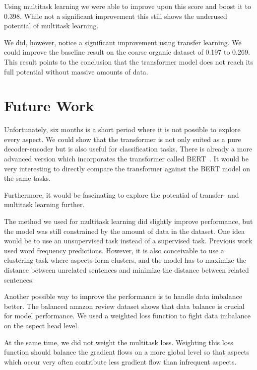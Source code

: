 Using multitask learning we were able to improve upon this score and boost it to 0.398. While not a significant improvement this still shows the underused potential of multitask learning.
\medskip

We did, however, notice a significant improvement using transfer learning. We could improve the baseline result on the coarse organic dataset of 0.197 to 0.269. This result points to the conclusion that the transformer model does not reach its full potential without massive amounts of data.

\section{Future Work}

Unfortunately, six months is a short period where it is not possible to explore every aspect. We could show that the transformer is not only suited as a pure decoder-encoder but is also useful for classification tasks. There is already a more advanced version which incorporates the transformer called BERT~\cite{Devlin2018}. It would be very interesting to directly compare the transformer against the BERT model on the same tasks.
\medskip

Furthermore, it would be fascinating to explore the potential of transfer- and multitask learning further.
\smallskip

The method we used for multitask learning did slightly improve performance, but the model was still constrained by the amount of data in the dataset. One idea would be to use an unsupervised task instead of a supervised task. Previous work used word frequency predictions. However, it is also conceivable to use a clustering task where aspects form clusters, and the model has to maximize the distance between unrelated sentences and minimize the distance between related sentences.
\medskip

Another possible way to improve the performance is to handle data imbalance better. The balanced amazon review dataset shows that data balance is crucial for model performance. We used a weighted loss function to fight data imbalance on the aspect head level.
\smallskip

At the same time, we did not weight the multitask loss. Weighting this loss function should balance the gradient flows on a more global level so that aspects which occur very often contribute less gradient flow than infrequent aspects.